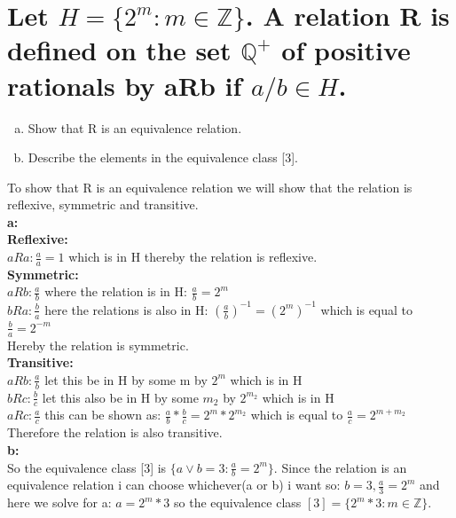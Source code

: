 \newpage
\section{Let $H = \{2^m : m\in \mathbb{Z}\}$. A relation R is defined on the set $\mathbb{Q}^{+}$ of positive rationals by aRb if $a/b\in H$.}
\begin{enumerate}[a.]
\item Show that R is an equivalence relation.
\item Describe the elements in the equivalence class [3].
\end{enumerate}
To show that R is an equivalence relation we will show that the relation is reflexive, symmetric and transitive.\\
\textbf{a:}\\
\textbf{Reflexive:}\\
$aRa: \frac{a}{a}=1$ which is in H thereby the relation is reflexive.\\
\textbf{Symmetric:}\\
$aRb: \frac{a}{b}$ where the relation is in H: $\frac{a}{b}=2^m$\\
$bRa: \frac{b}{a}$ here the relations is also in H: $\left(\frac{a}{b}\right)^{-1}=\left(2^m\right)^{-1}$ which is equal to $\frac{b}{a}=2^{-m}$\\
Hereby the relation is symmetric.\\
\textbf{Transitive:}\\
$aRb:\frac{a}{b}$ let this be in H by some m by $2^m$ which is in H\\
$bRc:\frac{b}{c}$ let this also be in H by some $m_2$ by $2^{m_2}$ which is in H\\
$aRc:\frac{a}{c}$ this can be shown as: $\frac{a}{b}*\frac{b}{c}=2^m*2^{m_2}$ which is equal to $\frac{a}{c}=2^{m+m_2}$\\
Therefore the relation is also transitive.\\
\textbf{b:}\\
So the equivalence class [3] is $\{a\vee b=3:\frac{a}{b}=2^m\}$. Since the relation is an equivalence relation i can choose whichever(a or b) i want so: $b=3,\frac{a}{3}=2^m$ and here we solve for a: $a=2^m*3$ so the equivalence class $[3]=\{2^m*3:m\in\mathbb{Z}\}$.
\newpage
